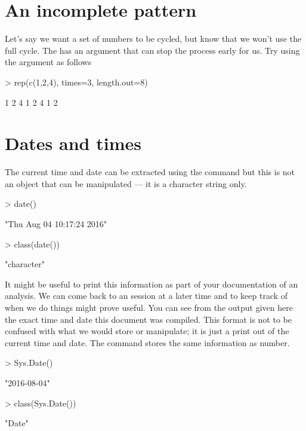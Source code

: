 \section{An incomplete pattern} 
 
Let's say we want a set of numbers to be cycled, but know that we won't use the full cycle. The  has an argument that can stop the process early for us. Try using the  argument as follows 
\begin{Schunk}
\begin{Sinput}
> rep(c(1,2,4), times=3, length.out=8) 
\end{Sinput}
\begin{Soutput}
[1] 1 2 4 1 2 4 1 2
\end{Soutput}
\end{Schunk}
 
 
\section{Dates and times} 
 
The current time and date can be extracted using the  command but this is not an object that can be manipulated --- it is a character string only. 
\begin{Schunk}
\begin{Sinput}
> date() 
\end{Sinput}
\begin{Soutput}
[1] "Thu Aug 04 10:17:24 2016"
\end{Soutput}
\begin{Sinput}
> class(date()) 
\end{Sinput}
\begin{Soutput}
[1] "character"
\end{Soutput}
\end{Schunk}
It might be useful to print this information as part of your documentation of an analysis. We can come back to an \R{} session at a later time and to keep track of when we do things might prove useful. You can see from the output given here the exact time and date this document was compiled. This format is not to be confused with what we would store or manipulate; it is just a print out of the current time and date. The  command stores the same information as number. 
\begin{Schunk}
\begin{Sinput}
> Sys.Date() 
\end{Sinput}
\begin{Soutput}
[1] "2016-08-04"
\end{Soutput}
\begin{Sinput}
> class(Sys.Date()) 
\end{Sinput}
\begin{Soutput}
[1] "Date"
\end{Soutput}
\end{Schunk}
 
